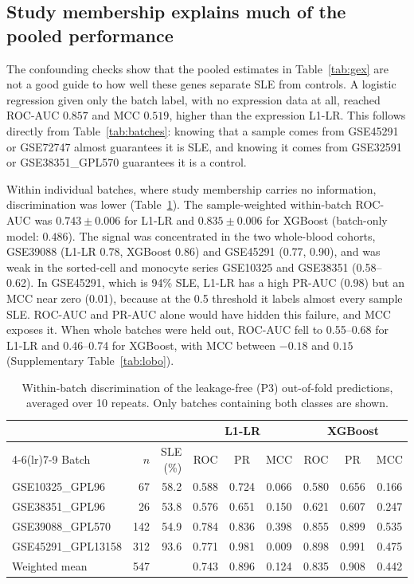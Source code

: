 \documentclass[11pt]{article}
\begin{document}
\subsection{Study membership explains much of the pooled performance}

The confounding checks show that the pooled estimates in Table~\ref{tab:gex} are not a good guide to how well these genes separate SLE from controls. A logistic regression given only the batch label, with no expression data at all, reached ROC-AUC $0.857$ and MCC $0.519$, higher than the expression L1-LR. This follows directly from Table~\ref{tab:batches}: knowing that a sample comes from GSE45291 or GSE72747 almost guarantees it is SLE, and knowing it comes from GSE32591 or GSE38351\_GPL570 guarantees it is a control.

Within individual batches, where study membership carries no information, discrimination was lower (Table~\ref{tab:within}). The sample-weighted within-batch ROC-AUC was $0.743 \pm 0.006$ for L1-LR and $0.835 \pm 0.006$ for XGBoost (batch-only model: $0.486$). The signal was concentrated in the two whole-blood cohorts, GSE39088 (L1-LR 0.78, XGBoost 0.86) and GSE45291 (0.77, 0.90), and was weak in the sorted-cell and monocyte series GSE10325 and GSE38351 (0.58--0.62). In GSE45291, which is 94\% SLE, L1-LR has a high PR-AUC (0.98) but an MCC near zero (0.01), because at the 0.5 threshold it labels almost every sample SLE. ROC-AUC and PR-AUC alone would have hidden this failure, and MCC exposes it. When whole batches were held out, ROC-AUC fell to 0.55--0.68 for L1-LR and 0.46--0.74 for XGBoost, with MCC between $-0.18$ and $0.15$ (Supplementary Table~\ref{tab:lobo}).

\begin{table}[t]
\centering
\caption{Within-batch discrimination of the leakage-free (P3) out-of-fold predictions, averaged over 10 repeats. Only batches containing both classes are shown.}
\label{tab:within}
\small
\begin{tabular}{lrrcccccc}
\toprule
 & & & \multicolumn{3}{c}{L1-LR} & \multicolumn{3}{c}{XGBoost} \\
\cmidrule(lr){4-6}\cmidrule(lr){7-9}
Batch & $n$ & SLE (\%) & ROC & PR & MCC & ROC & PR & MCC \\
\midrule
GSE10325\_GPL96    & 67  & 58.2 & 0.588 & 0.724 & 0.066 & 0.580 & 0.656 & 0.166 \\
GSE38351\_GPL96    & 26  & 53.8 & 0.576 & 0.651 & 0.150 & 0.621 & 0.607 & 0.247 \\
GSE39088\_GPL570   & 142 & 54.9 & 0.784 & 0.836 & 0.398 & 0.855 & 0.899 & 0.535 \\
GSE45291\_GPL13158 & 312 & 93.6 & 0.771 & 0.981 & 0.009 & 0.898 & 0.991 & 0.475 \\
\midrule
Weighted mean      & 547 &      & 0.743 & 0.896 & 0.124 & 0.835 & 0.908 & 0.442 \\
\bottomrule
\end{tabular}
\end{table}
\end{document}
